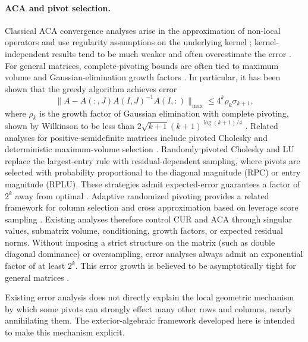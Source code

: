 \documentclass[11pt, preprint]{article}
\begin{document}
\paragraph{ACA and pivot selection.}
Classical ACA convergence analyses arise in the approximation of non-local operators and  use regularity assumptions on
the underlying kernel
\cite{Bebendorf_ApproximationBoundaryElement2000,
Bebendorf_AdaptiveLowRankApproximation2003}; kernel-independent results
tend to be much weaker and often overestimate the error
\cite{Bauer_KernelIndependentACA2022}. For general matrices, complete-pivoting
bounds are often tied to maximum volume and Gaussian-elimination growth factors
\cite{Cortinovis_MaximumVolumeSubmatrices2019}. In particular, it has been shown that the greedy algorithm achieves error \[
\|A - A(:,J)A(I,J)^{-1}A(I,:)\|_{\text{max}} \leq 4^k \rho_k \sigma_{k+1},
\]
where $\rho_k$ is the growth factor of Gaussian elimination with complete pivoting, shown by Wilkinson to be less than $2\sqrt{k+1}(k+1)^{\log(k+1)/4}$ \cite{Wilkinson_ErrorAnalysisDirect1961}. 
Related analyses for
positive-semidefinite matrices include pivoted Cholesky and deterministic
maximum-volume selection
\cite{Harbrecht_LowrankApproximationPivoted2012,Massei_SPSDMaxvol2022}. Randomly pivoted Cholesky and LU replace the largest-entry rule with residual-dependent sampling, where pivots are selected with probability proportional to the diagonal magnitude (RPC) or entry magnitude (RPLU). These strategies admit expected-error guarantees a factor of $2^k$ away from optimal \cite{Chen_RandomlyPivotedCholesky2025,Gilles_LowRankApproximationRandomly2026}. Adaptive randomized pivoting provides
a related framework for column selection and cross approximation based on leverage score sampling
\cite{Cortinovis_AdaptiveRandomizedPivoting2026}. 
Existing analyses therefore control CUR and ACA through singular values,
submatrix volume, conditioning, growth factors, or expected residual norms. Without imposing a strict structure on the matrix (such as double diagonal dominance) or oversampling, error analyses always admit an exponential factor of at least $2^k$. This error growth is believed to be asymptotically tight for general matrices \cite{Harbrecht_LowrankApproximationPivoted2012}. 

Existing error analysis does not directly explain the local geometric mechanism by which some pivots
can strongly effect many other rows and columns, nearly annihilating them. The exterior-algebraic
framework developed here is intended to make this mechanism explicit.
 
\end{document}
